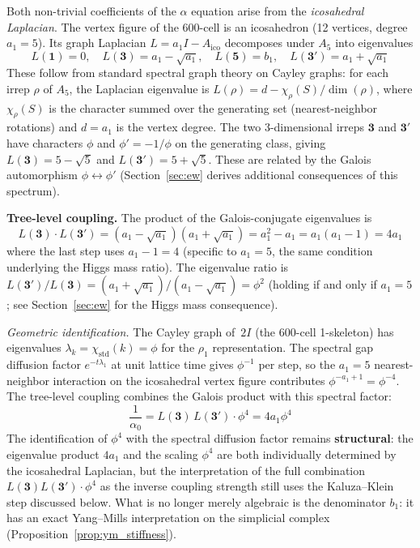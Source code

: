 \documentclass[12pt,a4paper]{article}
\theoremstyle{definition}
\begin{document}
Both non-trivial coefficients of the $\alpha$ equation arise from the \emph{icosahedral Laplacian}.  The vertex figure of the 600-cell is an icosahedron (12 vertices, degree~$a_1 = 5$).  Its graph Laplacian $L = a_1 I - A_{\text{ico}}$ decomposes under $A_5$ into eigenvalues
\begin{equation}
L(\mathbf{1}) = 0,\quad L(\mathbf{3}) = a_1 - \sqrt{a_1},\quad L(\mathbf{5}) = b_1,\quad L(\mathbf{3'}) = a_1 + \sqrt{a_1}
\label{eq:ico_laplacian}
\end{equation}
These follow from standard spectral graph theory on Cayley graphs: for each irrep $\rho$ of $A_5$, the Laplacian eigenvalue is $L(\rho) = d - \chi_\rho(S)/\dim(\rho)$, where $\chi_\rho(S)$ is the character summed over the generating set (nearest-neighbor rotations) and $d = a_1$ is the vertex degree.  The two 3-dimensional irreps $\mathbf{3}$ and $\mathbf{3'}$ have characters $\phi$ and $\phi' = -1/\phi$ on the generating class, giving $L(\mathbf{3}) = 5 - \sqrt{5}$ and $L(\mathbf{3'}) = 5 + \sqrt{5}$.  These are related by the Galois automorphism $\phi \leftrightarrow \phi'$ (Section~\ref{sec:ew} derives additional consequences of this spectrum).

\textbf{Tree-level coupling.}  The product of the Galois-conjugate eigenvalues is
\begin{equation}
L(\mathbf{3}) \cdot L(\mathbf{3'}) = (a_1 - \sqrt{a_1})(a_1+\sqrt{a_1}) = a_1^2 - a_1 = a_1(a_1-1) = 4a_1
\end{equation}
where the last step uses $a_1 - 1 = 4$ (specific to $a_1 = 5$, the same condition underlying the Higgs mass ratio).  The eigenvalue ratio is $L(\mathbf{3'})/L(\mathbf{3}) = (a_1 + \sqrt{a_1})/(a_1 - \sqrt{a_1}) = \phi^2$ (holding if and only if $a_1 = 5$; see Section~\ref{sec:ew} for the Higgs mass consequence).

\noindent\textit{Geometric identification.}  The Cayley graph of~$2I$ (the 600-cell 1-skeleton) has eigenvalues $\lambda_k = \chi_{\text{std}}(k) = \phi$ for the $\rho_1$ representation.  The spectral gap diffusion factor $e^{-t\lambda_1}$ at unit lattice time gives $\phi^{-1}$ per step, so the $a_1 = 5$ nearest-neighbor interaction on the icosahedral vertex figure contributes $\phi^{-a_1+1} = \phi^{-4}$.  The tree-level coupling combines the Galois product with this spectral factor:
\begin{equation}
\frac{1}{\alpha_0} = L(\mathbf{3})\,L(\mathbf{3'}) \cdot \phi^4 = 4a_1\phi^4
\label{eq:alpha0}
\end{equation}
The identification of $\phi^4$ with the spectral diffusion factor remains \textbf{structural}: the eigenvalue product $4a_1$ and the scaling $\phi^4$ are both individually determined by the icosahedral Laplacian, but the interpretation of the full combination $L(\mathbf{3})L(\mathbf{3'})\cdot\phi^4$ as the inverse coupling strength still uses the Kaluza--Klein step discussed below.  What is no longer merely algebraic is the denominator $b_1$: it has an exact Yang--Mills interpretation on the simplicial complex (Proposition~\ref{prop:ym_stiffness}).
\end{document}
